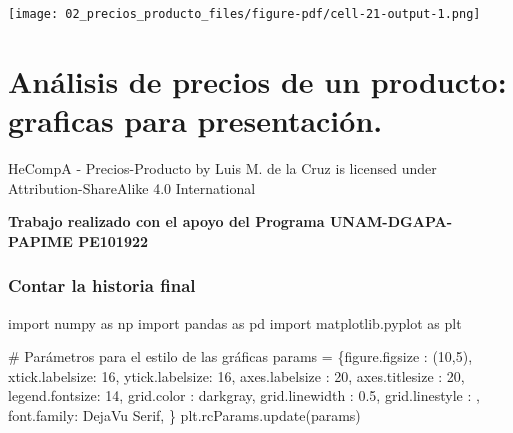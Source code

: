 \documentclass[
  letterpaper,
  DIV=11,
  numbers=noendperiod]{scrreprt}
\newenvironment{Shaded}{\begin{snugshade}}{\end{snugshade}}
\newcommand{\CommentTok}[1]{\textcolor[rgb]{0.37,0.37,0.37}{#1}}
\newcommand{\DecValTok}[1]{\textcolor[rgb]{0.68,0.00,0.00}{#1}}
\newcommand{\FloatTok}[1]{\textcolor[rgb]{0.68,0.00,0.00}{#1}}
\newcommand{\ImportTok}[1]{\textcolor[rgb]{0.00,0.46,0.62}{#1}}
\newcommand{\NormalTok}[1]{\textcolor[rgb]{0.00,0.23,0.31}{#1}}
\newcommand{\OperatorTok}[1]{\textcolor[rgb]{0.37,0.37,0.37}{#1}}
\newcommand{\StringTok}[1]{\textcolor[rgb]{0.13,0.47,0.30}{#1}}
\begin{document}
\texttt{[image: 02\_precios\_producto\_files/figure-pdf/cell-21-output-1.png]}


\chapter{Análisis de precios de un producto: graficas para
presentación.}\label{anuxe1lisis-de-precios-de-un-producto-graficas-para-presentaciuxf3n.}

HeCompA - Precios-Producto by Luis M. de la Cruz is licensed under
Attribution-ShareAlike 4.0 International

\textbf{Trabajo realizado con el apoyo del Programa UNAM-DGAPA-PAPIME
PE101922}

\subsection{Contar la historia final}\label{contar-la-historia-final}

\begin{Shaded}
\begin{Highlighting}[]
\ImportTok{import}\NormalTok{ numpy }\ImportTok{as}\NormalTok{ np}
\ImportTok{import}\NormalTok{ pandas }\ImportTok{as}\NormalTok{ pd}
\ImportTok{import}\NormalTok{ matplotlib.pyplot }\ImportTok{as}\NormalTok{ plt}

\CommentTok{\# Parámetros para el estilo de las gráficas}
\NormalTok{params }\OperatorTok{=}\NormalTok{ \{}\StringTok{\textquotesingle{}figure.figsize\textquotesingle{}}\NormalTok{ : (}\DecValTok{10}\NormalTok{,}\DecValTok{5}\NormalTok{),}
          \StringTok{\textquotesingle{}xtick.labelsize\textquotesingle{}}\NormalTok{: }\DecValTok{16}\NormalTok{,}
          \StringTok{\textquotesingle{}ytick.labelsize\textquotesingle{}}\NormalTok{: }\DecValTok{16}\NormalTok{,}
          \StringTok{\textquotesingle{}axes.labelsize\textquotesingle{}}\NormalTok{ : }\DecValTok{20}\NormalTok{,}
          \StringTok{\textquotesingle{}axes.titlesize\textquotesingle{}}\NormalTok{ : }\DecValTok{20}\NormalTok{,}
          \StringTok{\textquotesingle{}legend.fontsize\textquotesingle{}}\NormalTok{: }\DecValTok{14}\NormalTok{,}
          \StringTok{\textquotesingle{}grid.color\textquotesingle{}}\NormalTok{     : }\StringTok{\textquotesingle{}darkgray\textquotesingle{}}\NormalTok{,}
          \StringTok{\textquotesingle{}grid.linewidth\textquotesingle{}}\NormalTok{ : }\FloatTok{0.5}\NormalTok{,}
          \StringTok{\textquotesingle{}grid.linestyle\textquotesingle{}}\NormalTok{ : }\StringTok{\textquotesingle{}{-}{-}\textquotesingle{}}\NormalTok{,}
          \StringTok{\textquotesingle{}font.family\textquotesingle{}}\NormalTok{: }\StringTok{\textquotesingle{}DejaVu Serif\textquotesingle{}}\NormalTok{,}
\NormalTok{         \}}
\NormalTok{plt.rcParams.update(params)}
\end{Highlighting}
\end{Shaded}
\end{document}
